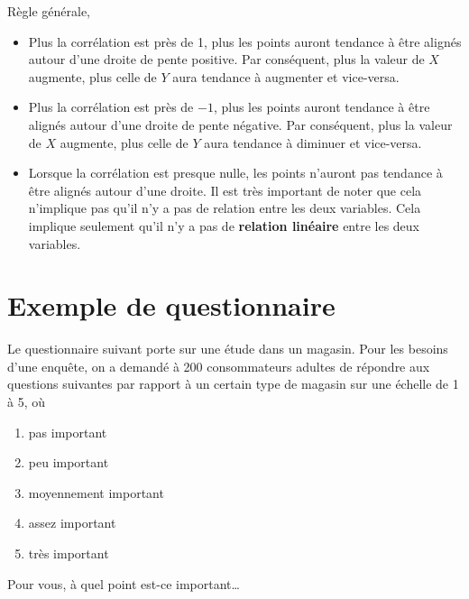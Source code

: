 \documentclass[
  11pt,
  letterpaper,
]{book}
\providecommand{\tightlist}{%
  \setlength{\itemsep}{0pt}\setlength{\parskip}{0pt}}
\theoremstyle{definition}
\theoremstyle{definition}
\theoremstyle{definition}
\theoremstyle{definition}
\theoremstyle{remark}
\begin{document}
Règle générale,

\begin{itemize}
\tightlist
\item
  Plus la corrélation est près de 1, plus les points auront tendance à être alignés autour d'une droite de pente positive. Par conséquent, plus la valeur de \(X\) augmente, plus celle de \(Y\) aura tendance à augmenter et vice-versa.
\item
  Plus la corrélation est près de \(-1\), plus les points auront tendance à être alignés autour d'une droite de pente négative. Par conséquent, plus la valeur de \(X\) augmente, plus celle de \(Y\) aura tendance à diminuer et vice-versa.
\item
  Lorsque la corrélation est presque nulle, les points n'auront pas tendance à être alignés autour d'une droite. Il est très important de noter que cela n'implique pas qu'il n'y a pas de relation entre les deux variables. Cela implique seulement qu'il n'y a pas de \textbf{relation linéaire} entre les deux variables.
\end{itemize}

\hypertarget{exemple-de-questionnaire}{%
\section{Exemple de questionnaire}\label{exemple-de-questionnaire}}

Le questionnaire suivant porte sur une étude dans un magasin. Pour les besoins d'une enquête, on a demandé à 200 consommateurs adultes de répondre aux questions suivantes par rapport à un certain type de magasin sur une échelle de 1 à 5, où

\begin{enumerate}
\def\labelenumi{\arabic{enumi}.}
\tightlist
\item
  pas important
\item
  peu important
\item
  moyennement important
\item
  assez important
\item
  très important
\end{enumerate}

Pour vous, à quel point est-ce important\ldots
\end{document}
